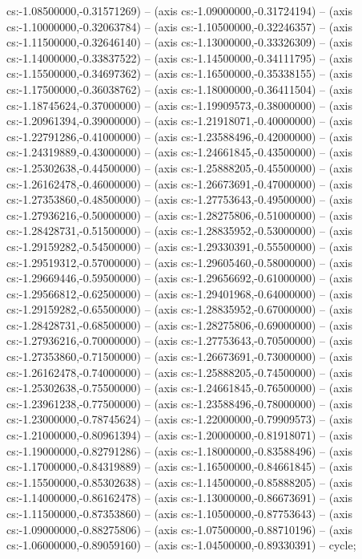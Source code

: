 cs:-1.08500000,-0.31571269) -- (axis cs:-1.09000000,-0.31724194) -- (axis cs:-1.10000000,-0.32063784) -- (axis cs:-1.10500000,-0.32246357) -- (axis cs:-1.11500000,-0.32646140) -- (axis cs:-1.13000000,-0.33326309) -- (axis cs:-1.14000000,-0.33837522) -- (axis cs:-1.14500000,-0.34111795) -- (axis cs:-1.15500000,-0.34697362) -- (axis cs:-1.16500000,-0.35338155) -- (axis cs:-1.17500000,-0.36038762) -- (axis cs:-1.18000000,-0.36411504) -- (axis cs:-1.18745624,-0.37000000) -- (axis cs:-1.19909573,-0.38000000) -- (axis cs:-1.20961394,-0.39000000) -- (axis cs:-1.21918071,-0.40000000) -- (axis cs:-1.22791286,-0.41000000) -- (axis cs:-1.23588496,-0.42000000) -- (axis cs:-1.24319889,-0.43000000) -- (axis cs:-1.24661845,-0.43500000) -- (axis cs:-1.25302638,-0.44500000) -- (axis cs:-1.25888205,-0.45500000) -- (axis cs:-1.26162478,-0.46000000) -- (axis cs:-1.26673691,-0.47000000) -- (axis cs:-1.27353860,-0.48500000) -- (axis cs:-1.27753643,-0.49500000) -- (axis cs:-1.27936216,-0.50000000) -- (axis cs:-1.28275806,-0.51000000) -- (axis cs:-1.28428731,-0.51500000) -- (axis cs:-1.28835952,-0.53000000) -- (axis cs:-1.29159282,-0.54500000) -- (axis cs:-1.29330391,-0.55500000) -- (axis cs:-1.29519312,-0.57000000) -- (axis cs:-1.29605460,-0.58000000) -- (axis cs:-1.29669446,-0.59500000) -- (axis cs:-1.29656692,-0.61000000) -- (axis cs:-1.29566812,-0.62500000) -- (axis cs:-1.29401968,-0.64000000) -- (axis cs:-1.29159282,-0.65500000) -- (axis cs:-1.28835952,-0.67000000) -- (axis cs:-1.28428731,-0.68500000) -- (axis cs:-1.28275806,-0.69000000) -- (axis cs:-1.27936216,-0.70000000) -- (axis cs:-1.27753643,-0.70500000) -- (axis cs:-1.27353860,-0.71500000) -- (axis cs:-1.26673691,-0.73000000) -- (axis cs:-1.26162478,-0.74000000) -- (axis cs:-1.25888205,-0.74500000) -- (axis cs:-1.25302638,-0.75500000) -- (axis cs:-1.24661845,-0.76500000) -- (axis cs:-1.23961238,-0.77500000) -- (axis cs:-1.23588496,-0.78000000) -- (axis cs:-1.23000000,-0.78745624) -- (axis cs:-1.22000000,-0.79909573) -- (axis cs:-1.21000000,-0.80961394) -- (axis cs:-1.20000000,-0.81918071) -- (axis cs:-1.19000000,-0.82791286) -- (axis cs:-1.18000000,-0.83588496) -- (axis cs:-1.17000000,-0.84319889) -- (axis cs:-1.16500000,-0.84661845) -- (axis cs:-1.15500000,-0.85302638) -- (axis cs:-1.14500000,-0.85888205) -- (axis cs:-1.14000000,-0.86162478) -- (axis cs:-1.13000000,-0.86673691) -- (axis cs:-1.11500000,-0.87353860) -- (axis cs:-1.10500000,-0.87753643) -- (axis cs:-1.09000000,-0.88275806) -- (axis cs:-1.07500000,-0.88710196) -- (axis cs:-1.06000000,-0.89059160) -- (axis cs:-1.04500000,-0.89330391) -- cycle;
